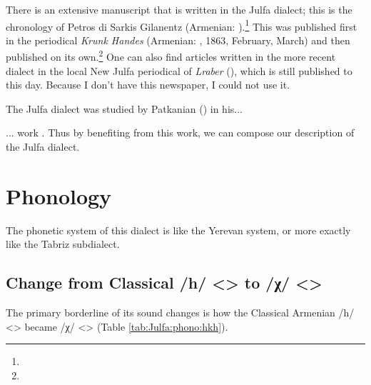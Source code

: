 There   is an extensive manuscript that is written in the Julfa dialect; this is the chronology of Petros di Sarkis Gilanentz (Armenian: ).\footnote{} This was published first in the periodical \textit{Krunk Handes} (Armenian: , 1863, February, March) and then published on its own.\footnote{} One can also find articles written in the more recent dialect in the local New Julfa periodical of \textit{Lraber} (), which is still published to this day. Because I don't have this newspaper, I could not use it. 

The Julfa dialect was studied by Patkanian () in his... 

\begin{adjarianpage}\label{page:88}\end{adjarianpage}%

... work \citep[76-103]{Patkanian-1869-RussianDialects}. Thus by benefiting from this work, we can compose our description of the Julfa dialect. 


\section{Phonology}
The phonetic system of this dialect is like the Yerevan system, or more exactly like the Tabriz subdialect. 

\subsection{Change from Classical /h/ <> to /χ/ <>}

The primary borderline of its sound changes is how the Classical Armenian /h/ <> became /χ/ <> (Table \ref{tab:Julfa:phono:hkh}). 


